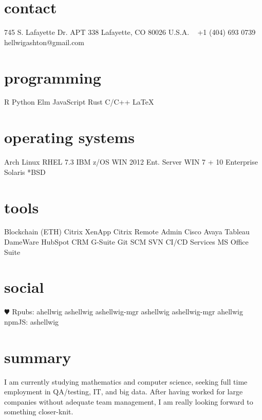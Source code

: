 \documentclass[]{cv-style}
\newcommand{\colorLinkedin}{\textcolor{rgb:red,6;green,108;blue,170}{\faLinkedin}}
\begin{document}
\lastupdated

\begin{aside}
%
\section{contact}
745 S. Lafayette Dr. APT 338
Lafayette, CO 80026
U.S.A.
~
+1 (404) 693 0739
\hspace{-5.0cm}hellwigashton@gmail.com
~
\section{programming}
R
Python
Elm
JavaScript
Rust
C/C++
\LaTeX{}
\section{operating systems}
Arch Linux
RHEL 7.3
IBM z/OS
WIN 2012 Ent. Server
WIN 7 + 10 Enterprise
Solaris
*BSD
\section{tools}
Blockchain (ETH)
Citrix XenApp
Citrix Remote Admin
Cisco
Avaya
Tableau
DameWare
HubSpot CRM
G-Suite
Git SCM
SVN
CI/CD Services
MS Office Suite
\section{social}
{\color{red} $\varheartsuit$} Rpubs: ahellwig
\faGithub\hspace{0.1ex} ashellwig
\faGithub\hspace{0.1ex} ashellwig-mgr
\faGitlab\hspace{0.1ex} ashellwig
\faGitlab\hspace{0.1ex} ashellwig-mgr
\colorLinkedin\hspace{0.1ex} ahellwig
npmJS: ashellwig
\end{aside}

\section{summary}
  \vspace{-0.2cm}
I am currently studying mathematics and computer science, seeking full time employment in QA/testing, IT, and big data. After having worked for large companies without adequate team management, I am really looking forward to something closer-knit.
\end{document}
